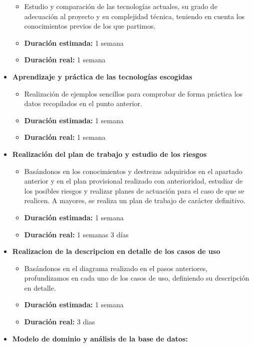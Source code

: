 \documentclass[openright,twoside,10pt]{book}
\providecommand{\tightlist}{%
  \setlength{\itemsep}{0pt}\setlength{\parskip}{0pt}}
\begin{document}
\begin{itemize}
      \begin{itemize}
      \tightlist
      \item
        Estudio y comparación de las tecnologías actuales, su grado de
        adecuación al proyecto y su complejidad técnica, teniendo en cuenta
        los conocimientos previos de los que partimos.
      \item
        \textbf{Duración estimada:} 1 semana
      \item
        \textbf{Duración real:} 1 semana
      \end{itemize}
    \item
      \textbf{Aprendizaje y práctica de las tecnologías escogidas}
    
      \begin{itemize}
      \tightlist
      \item
        Realización de ejemplos sencillos para comprobar de forma práctica
        los datos recopilados en el punto anterior.
      \item
        \textbf{Duración estimada:} 1 semana
      \item
        \textbf{Duración real:} 1 semana
      \end{itemize}
    \item
      \textbf{Realización del plan de trabajo y estudio de los riesgos}
    
      \begin{itemize}
      \tightlist
      \item
        Basándonos en los conocimientos y destrezas adquiridos en el
        apartado anterior y en el plan provisional realizado con
        anterioridad, estudiar de los posibles riesgos y realizar planes de
        actuación para el caso de que se realicen. A mayores, se realiza un
        plan de trabajo de carácter definitivo.
      \item
        \textbf{Duración estimada:} 1 semana
      \item
        \textbf{Duración real:} 1 semanas 3 días
      \end{itemize}
    \item
      \textbf{Realizacion de la descripcion en detalle de los casos de uso}
    
      \begin{itemize}
      \tightlist
      \item
        Basándonos en el diagrama realizado en el pasos anteriores,
        profundizamos en cada uno de los casos de uso, definiendo su
        descripción en detalle.
      \item
        \textbf{Duración estimada:} 1 semana
      \item
        \textbf{Duración real:} 3 dias
      \end{itemize}
    \item
      \textbf{Modelo de dominio y análisis de la base de datos:}
    

\end{itemize}
\end{document}
